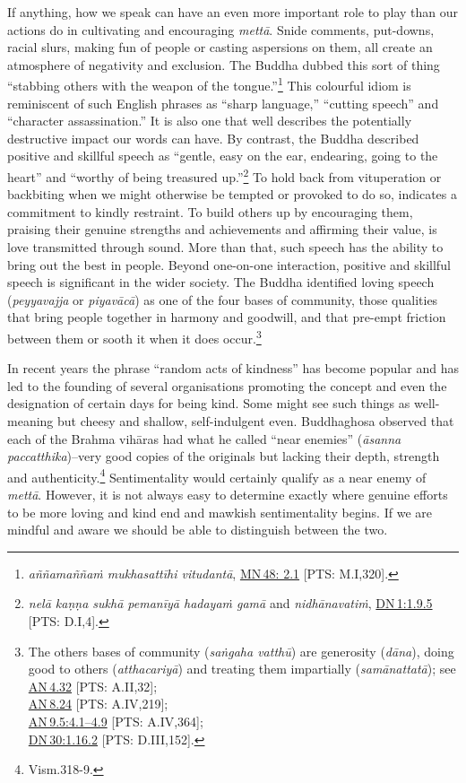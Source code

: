 \documentclass[10pt, openright]{book}
\begin{document}
If anything, how we speak can have an even more important role to play than our actions do in cultivating and encouraging \textit{mettā}. Snide comments, put-downs, racial slurs, making fun of people or casting aspersions on them, all create an atmosphere of negativity and exclusion. The Buddha dubbed this sort of thing “stabbing others with the weapon of the tongue.”\footnote {\textit{aññamaññaṁ mukhasattīhi vitudantā}, \href{https://suttacentral.net/mn48/en/sujato\#2.1}{MN 48: 2.1} [PTS: M.I,320].} This colourful idiom is reminiscent of such English phrases as “sharp language,” “cutting speech” and “character assassination.” It is also one that well describes the potentially destructive impact our words can have. By contrast, the Buddha described positive and skillful speech as “gentle, easy on the ear, endearing, going to the heart” and “worthy of being treasured up.”\footnote {\textit{nelā kaṇṇa sukhā pemanīyā hadayaṁ gamā} and \textit{nidhānavatiṁ}, \href{https://suttacentral.net/dn1/en/sujato\#1.9.5}{DN 1:1.9.5} [PTS: D.I,4].} To hold back from vituperation or backbiting when we might otherwise be tempted or provoked to do so, indicates a commitment to kindly restraint. To build others up by encouraging them, praising their genuine strengths and achievements and affirming their value, is love transmitted through sound. More than that, such speech has the ability to bring out the best in people. Beyond one-on-one interaction, positive and skillful speech is significant in the wider society. The Buddha identified loving speech (\textit{peyyavajja} or \textit{piyavācā}) as one of the four bases of community, those qualities that bring people together in harmony and goodwill, and that pre-empt friction between them or sooth it when it does occur.\footnote {The others bases of community (\textit{saṅgaha vatthū}) are generosity (\textit{dāna}), doing good to others (\textit{atthacariyā}) and treating them impartially (\textit{samānattatā}); see\\
\href{https://suttacentral.net/an4.32/en/sujato}{AN 4.32} [PTS: A.II,32];\\
\href{https://suttacentral.net/an8.24/en/sujato}{AN 8.24} [PTS: A.IV,219];\\
\href{https://suttacentral.net/an9.5/en/sujato\#4.1}{AN 9.5:4.1–4.9} [PTS: A.IV,364];\\
\href{https://suttacentral.net/dn30/en/sujato\#1.16.2}{DN 30:1.16.2} [PTS: D.III,152].}


In recent years the phrase “random acts of kindness” has become popular and has led to the founding of several organisations promoting the concept and even the designation of certain days for being kind. Some might see such things as well-meaning but cheesy and shallow, self-indulgent even. Buddhaghosa observed that each of the Brahma vihāras had what he called “near enemies” (\textit{āsanna paccatthika})–very good copies of the originals but lacking their depth, strength and authenticity.\footnote {Vism.318-9.} Sentimentality would certainly qualify as a near enemy of \textit{mettā}. However, it is not always easy to determine exactly where genuine efforts to be more loving and kind end and mawkish sentimentality begins. If we are mindful and aware we should be able to distinguish between the two.
\end{document}
